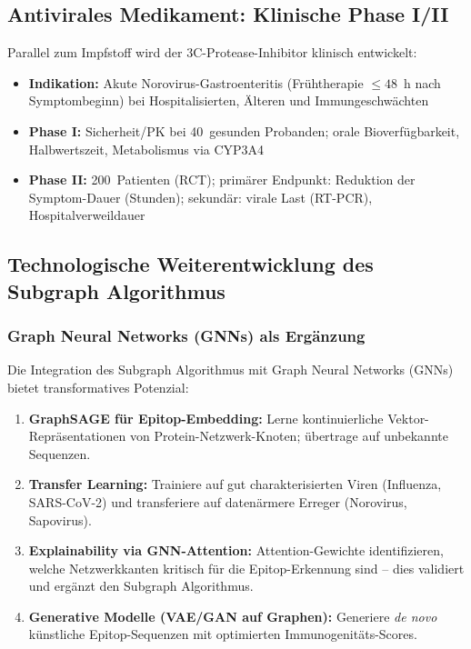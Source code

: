 ﻿\documentclass[a4paper,12pt]{article}
\theoremstyle{plain}
\theoremstyle{definition}
\theoremstyle{remark}
\begin{document}
\subsection{Antivirales Medikament: Klinische Phase I/II}

Parallel zum Impfstoff wird der 3C-Protease-Inhibitor klinisch entwickelt:

\begin{itemize}
  \item \textbf{Indikation:} Akute Norovirus-Gastroenteritis (Frühtherapie $\leq48$~h
        nach Symptombeginn) bei Hospitalisierten, Älteren und Immungeschwächten
  \item \textbf{Phase I:} Sicherheit/PK bei 40~gesunden Probanden; orale Bioverfügbarkeit,
        Halbwertszeit, Metabolismus via CYP3A4
  \item \textbf{Phase II:} 200~Patienten (RCT); primärer Endpunkt: Reduktion der
        Symptom-Dauer (Stunden); sekundär: virale Last (RT-PCR), Hospitalverweildauer
\end{itemize}

\subsection{Technologische Weiterentwicklung des Subgraph Algorithmus}

\subsubsection{Graph Neural Networks (GNNs) als Ergänzung}

Die Integration des Subgraph Algorithmus mit Graph Neural Networks (GNNs) bietet
transformatives Potenzial:

\begin{enumerate}
  \item \textbf{GraphSAGE für Epitop-Embedding:} Lerne kontinuierliche Vektor-Repräsentationen
        von Protein-Netzwerk-Knoten; übertrage auf unbekannte Sequenzen.
  \item \textbf{Transfer Learning:} Trainiere auf gut charakterisierten Viren
        (Influenza, SARS-CoV-2) und transferiere auf datenärmere Erreger (Norovirus,
        Sapovirus).
  \item \textbf{Explainability via GNN-Attention:} Attention-Gewichte identifizieren,
        welche Netzwerkkanten kritisch für die Epitop-Erkennung sind -- dies validiert
        und ergänzt den Subgraph Algorithmus.
  \item \textbf{Generative Modelle (VAE/GAN auf Graphen):} Generiere \textit{de novo}
        künstliche Epitop-Sequenzen mit optimierten Immunogenitäts-Scores.
\end{enumerate}
\end{document}
